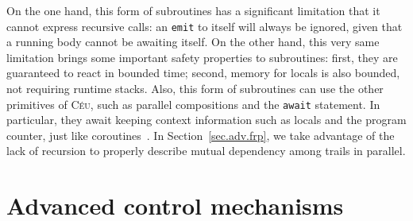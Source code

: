 \documentclass{acm_proc_article-sp}
\newcommand{\CEU}{\textsc{C\'{e}u}\xspace}
\newcommand{\code}[1] {{\small{\texttt{#1}}}}
\newcommand{\1}{\;}
\newcommand{\2}{\;\;}
\newcommand{\3}{\;\;\;}
\newcommand{\5}{\;\;\;\;\;}
\begin{document}
On the one hand, this form of subroutines has a significant limitation that it 
cannot express recursive calls: an \code{emit} to itself will always be 
ignored, given that a running body cannot be awaiting itself.
%
On the other hand, this very same limitation brings some important safety 
properties to subroutines:
first, they are guaranteed to react in bounded time;
second, memory for locals is also bounded, not requiring runtime stacks.
%
Also, this form of subroutines can use the other primitives of \CEU, such as 
parallel compositions and the \code{await} statement.
In particular, they await keeping context information such as locals and the 
program counter, just like coroutines~\cite{lua.coroutines}.
%
In Section~\ref{sec.adv.frp}, we take advantage of the lack of recursion to 
properly describe mutual dependency among trails in parallel.

\section{Advanced control mechanisms}
\label{sec.adv}
\end{document}
